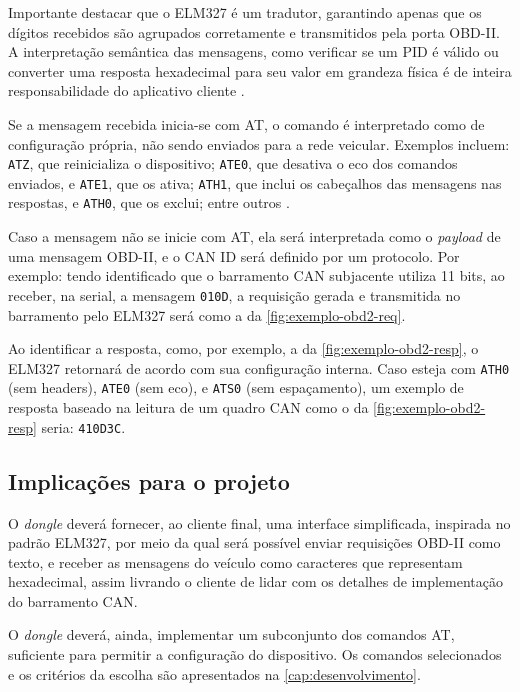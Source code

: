 Importante destacar que o ELM327 é um tradutor, garantindo apenas que os dígitos recebidos são agrupados corretamente e transmitidos pela porta OBD-II. A interpretação semântica das mensagens, como verificar se um PID é válido ou converter uma resposta hexadecimal para seu valor em grandeza física é de inteira responsabilidade do aplicativo cliente \cite{elm327datasheet}.

Se a mensagem recebida inicia-se com AT, o comando é interpretado como de configuração própria, não sendo enviados para a rede veicular. Exemplos incluem: \texttt{ATZ}, que reinicializa o dispositivo; \texttt{ATE0}, que desativa o eco dos comandos enviados, e \texttt{ATE1}, que os ativa; \texttt{ATH1}, que inclui os cabeçalhos das mensagens nas respostas, e \texttt{ATH0}, que os exclui; entre outros \cite{elm327datasheet}.

Caso a mensagem não se inicie com AT, ela será interpretada como o \textit{payload} de uma mensagem OBD-II, e o CAN ID será definido por um protocolo. Por exemplo: tendo identificado que o barramento CAN subjacente utiliza 11 bits, ao receber, na serial, a mensagem \texttt{010D}, a requisição gerada e transmitida no barramento pelo ELM327 será como a da \autoref{fig:exemplo-obd2-req}.

Ao identificar a resposta, como, por exemplo, a da \autoref{fig:exemplo-obd2-resp}, o ELM327 retornará de acordo com sua configuração interna. Caso esteja com \texttt{ATH0} (sem headers), \texttt{ATE0} (sem eco), e \texttt{ATS0} (sem espaçamento), um exemplo de resposta baseado na leitura de um quadro CAN como o da \autoref{fig:exemplo-obd2-resp} seria: \texttt{410D3C}.

\subsection{Implicações para o projeto}

O \textit{dongle} deverá fornecer, ao cliente final, uma interface simplificada, inspirada no padrão ELM327, por meio da qual será possível enviar requisições OBD-II como texto, e receber as mensagens do veículo como caracteres que representam hexadecimal, assim livrando o cliente de lidar com os detalhes de implementação do barramento CAN.

O \textit{dongle} deverá, ainda, implementar um subconjunto dos comandos AT, suficiente para permitir a configuração do dispositivo. Os comandos selecionados e os critérios da escolha são apresentados na \autoref{cap:desenvolvimento}. 

